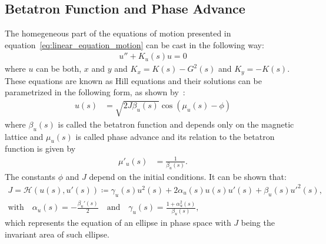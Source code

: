 \subsection{Betatron Function and Phase Advance} \label{ssub:betatron_function}

    The homegeneous part of the equations of motion presented in equation~\eqref{eq:linear_equation_motion} can be cast in the following way:
    \begin{align}
        u'' + K_u(s)u = 0
    \end{align}
    where $u$ can be both, $x$ and $y$ and $K_x=K(s)-G^2(s)$ and $K_y=-K(s)$. These equations are known as Hill equations and their solutions can be parametrized in the following form, as shown by~:
	\begin{align} \label{eq:betatron_motion}
		u(s) &= \sqrt{2J\beta_u(s)} \cos(\mu_u(s) - \phi)
	\end{align}
	where $\beta_u(s)$ is called the betatron function and depends only on the magnetic lattice and $\mu_u(s)$ is called phase advance and its relation to the betatron function is given by
	\begin{align}\label{eq:phase_advance}
		\mu'_u(s) &= \frac{1}{\beta_u(s)}.
	\end{align}
	The constants $\phi$ and $J$ depend on the initial conditions. It can be shown that:
	\begin{gather} \label{eq:linear_invariant}
		J = \mathscr{H}(u(s), u'(s)) \coloneqq \gamma_u(s)u^2(s) + 2\alpha_u(s)u(s)u'(s) + \beta_u(s)u'^2(s), \\[3mm]
        \text{with}\quad
        \alpha_u(s) = -\frac{\beta_u'(s)}{2} \quad \text{and} \nonumber \quad
		\gamma_u(s) = \frac{1+\alpha_u^2(s)}{\beta_u(s)},
	\end{gather}
	which represents the equation of an ellipse in phase space with $J$ being the invariant area of such ellipse.

